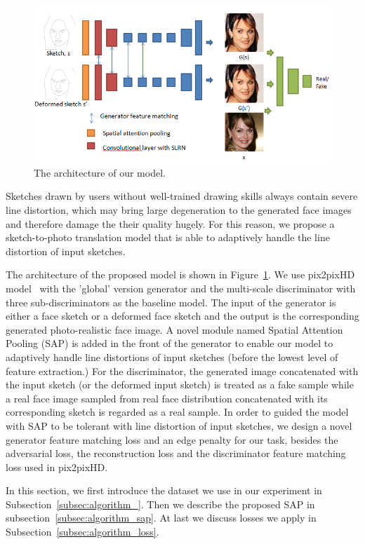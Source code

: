% 
\begin{figure}
	\includegraphics[width=\textwidth]{figs/architecture.png}
	\caption{The architecture of our model.}
	\label{fig:architecture}
\end{figure}
%


Sketches drawn by users without well-trained drawing skills always contain severe line distortion, which may bring large degeneration to the generated face images and therefore damage the their quality hugely.
%
For this reason, we propose a sketch-to-photo translation model that is able to adaptively handle the line distortion of input sketches.

The architecture of the proposed model is shown in Figure~\ref{fig:architecture}. We use pix2pixHD model~\cite{pix2pixHD} with the 'global' version generator and the multi-scale discriminator with three sub-discriminators as the baseline model. The input of the generator is either a face sketch or a deformed face sketch and the output is the corresponding generated photo-realistic face image. A novel module named Spatial Attention Pooling (SAP) is added in the front of the generator to enable our model to adaptively handle line distortions of input sketches \td(before the lowest level of feature extraction.) 
%
For the discriminator, the generated image concatenated with the input sketch (or the deformed input sketch) is treated as a fake sample while a real face image sampled from real face distribution concatenated with its corresponding sketch is regarded as a real sample. 
%
%
In order to guided the model with SAP to be tolerant with line distortion of input sketches, we design a novel generator feature matching loss and an edge penalty  for our task, besides the adversarial loss, the reconstruction loss and the discriminator feature matching loss used in pix2pixHD.
%

In this section, we first introduce the dataset we use in our experiment in Subsection~\ref{subsec:algorithm_}. Then we describe the proposed SAP in subsection~\ref{subsec:algorithm_sap}. At last we discuss losses we apply in Subsection~\ref{subsec:algorithm_loss}.

